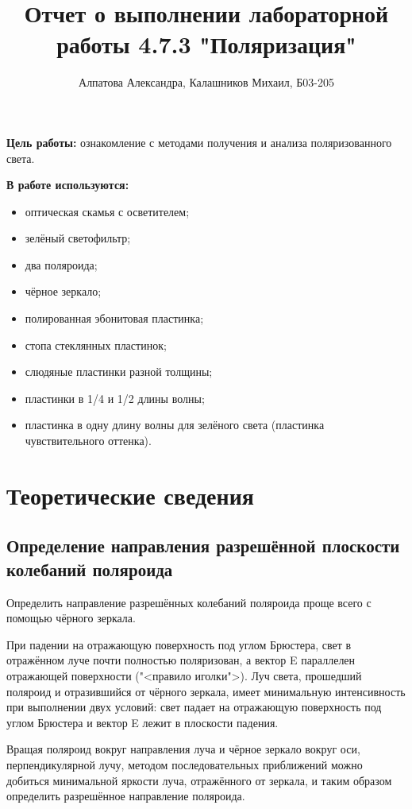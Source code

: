 \documentclass[14pt, a4paper]{report}
\title{\textbf{Отчет о выполнении лабораторной работы 4.7.3 "Поляризация"}}
\author{Алпатова Александра, Калашников Михаил, Б03-205}
\date{}
\begin{document}
\maketitle

\textbf{Цель работы:}
ознакомление с методами получения и анализа поляризованного света.
\newline

\textbf{В работе используются:}
\begin{itemize}
\item оптическая скамья с осветителем;
\item зелёный светофильтр;
\item два поляроида;
\item чёрное зеркало;
\item полированная эбонитовая пластинка;
\item стопа стеклянных пластинок;
\item слюдяные пластинки разной толщины;
\item пластинки в 1/4 и 1/2 длины волны;
\item пластинка в одну длину волны для зелёного света (пластинка чувствительного оттенка).
\end{itemize}

\section{Теоретические сведения}

\subsection{Определение направления разрешённой плоскости колебаний поляроида}
	
	Определить направление разрешённых колебаний поляроида проще всего с помощью чёрного зеркала.
	
При падении на отражающую поверхность под углом Брюстера, свет в отражённом луче почти полностью поляризован, а вектор E параллелен отражающей поверхности ("<правило иголки">). Луч света, прошедший поляроид и отразившийся от чёрного зеркала, имеет минимальную интенсивность при выполнении двух условий: свет падает на отражающую поверхность под углом Брюстера и вектор E лежит в плоскости падения.

Вращая поляроид вокруг направления луча и чёрное зеркало вокруг оси, перпендикулярной лучу, методом последовательных приближений можно добиться минимальной яркости луча, отражённого от зеркала, и таким образом определить разрешённое направление поляроида.
\end{document}
